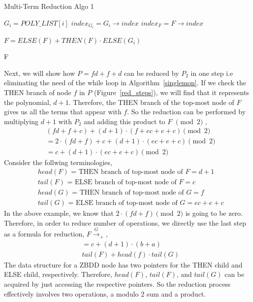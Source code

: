 \documentclass{article}
\theoremstyle{definition}
\begin{document}
\begin{algorithm}
\caption{Multi-Term Reduction Algo 1}
\label{multimon}
\begin{algorithmic}[1]
\State $G_i = POLY\_LIST[i]$
\State $index_{G_i} = G_i \rightarrow index$
\State $index_F = F \rightarrow index$

\State $F = ELSE(F) + THEN(F)\cdot ELSE(G_i)$
\EndIf

\EndFor
\State \Return F
\EndProcedure
\end{algorithmic}
\end{algorithm}

\par Next, we will show how $P = fd + f + d$ can be reduced by $P_2$ in one step i.e eliminating the need of the while loop in Algorithm~\ref{singlemon}. If we check the THEN branch of node $f$ in $P$ (Figure~\ref{red_steps}), we will find that it represents the polynomial, $d + 1$. Therefore, the THEN branch of the top-most node of $F$ gives us all the terms that appear with $f$. So the reduction can be performed by multiplying $d + 1$ with $P_2$ and adding this product to $F$ $\pmod{2}$ ,
\begin{align*}
& (fd + f + c) + (d + 1)\cdot(f + ec + e + c) \pmod{2}\\
&= 2\cdot(fd + f) + c + (d+1)\cdot(ec + e + c) \pmod{2}\\
&= c + (d+1)\cdot(ec + e + c)  \pmod{2}
\end{align*}
Consider the follwing terminologies,
\begin{align*}
& \text{$head(F)$ = THEN branch of top-most node of $F$} = d + 1\\
& \text{$tail(F)$ = ELSE branch of top-most node of $F$} = c\\
& \text{$head(G)$ = THEN branch of top-most node of $G$} = f\\
& \text{$tail(G)$ = ELSE branch of top-most node of $G$} = ec + e + c
\end{align*}
In the above example, we know that $2\cdot(fd + f) \pmod{2}$ is going to be zero. Therefore, in order to reduce number of operations, we directly use the last step as a formula for reduction, $F \xrightarrow{G}_+$,
\begin{align*}
&= c + (d+1)\cdot(b + a) \\
& tail(F) + head(f)\cdot tail(G)
\end{align*}
The data structure for a ZBDD node has two pointers for the THEN child and ELSE child, respectively. Therefore, $head(F)$, $tail(F)$, and $tail(G)$ can be acquired by just accessing the respective pointers. So the reduction process effectively involves two operations, a modulo 2 sum and a product.
\end{document}
